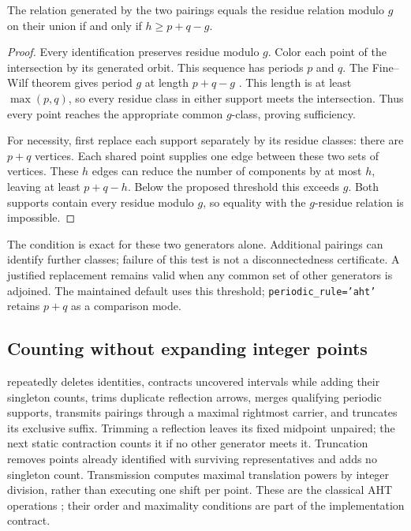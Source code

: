 \begin{proposition}
The relation generated by the two pairings equals the residue relation
modulo $g$ on their union if and only if $h\ge p+q-g$.
\end{proposition}
\begin{proof}
Every identification preserves residue modulo $g$. Color each point of the
intersection by its generated orbit. This sequence has periods $p$ and $q$.
The Fine--Wilf theorem gives period $g$ at length $p+q-g$
\cite{fine-wilf-orbits}. This length is at least $\max(p,q)$, so every residue
class in either support meets the intersection. Thus every point reaches
the appropriate common $g$-class, proving sufficiency.

For necessity, first replace each support separately by its residue
classes: there are $p+q$ vertices. Each shared point supplies one edge
between these two sets of vertices. These $h$ edges can reduce the number
of components by at most $h$, leaving at least $p+q-h$. Below the proposed
threshold this exceeds $g$. Both supports contain every residue modulo
$g$, so equality with the $g$-residue relation is impossible.
\end{proof}

The condition is exact for these two generators alone. Additional pairings
can identify further classes; failure of this test is not a disconnectedness
certificate. A justified replacement remains valid when any common set of
other generators is adjoined. The maintained default uses this threshold;
\texttt{periodic\_rule='aht'} retains $p+q$ as a comparison mode.

\subsection{Counting without expanding integer points}

 repeatedly deletes identities,
contracts uncovered intervals while adding their singleton counts, trims
duplicate reflection arrows, merges qualifying periodic supports, transmits
pairings through a maximal rightmost carrier, and truncates its exclusive
suffix. Trimming a reflection leaves its fixed midpoint unpaired; the next
static contraction counts it if no other generator meets it. Truncation
removes points already identified with surviving representatives and adds
no singleton count. Transmission computes maximal translation powers by
integer division, rather than executing one shift per point. These are the
classical AHT operations \cite{aht-orbits}; their order and maximality
conditions are part of the implementation contract.

